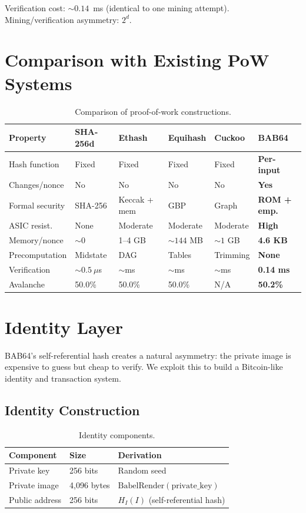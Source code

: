 \documentclass[preprint]{iacrtrans}
\begin{document}
Verification cost: ${\sim}0.14$~ms (identical to one mining attempt). Mining/verification asymmetry: $2^d$.

\section{Comparison with Existing PoW Systems}

\begin{table}[h]
\centering
\small
\begin{tabular}{@{}lp{1.5cm}p{1.5cm}p{1.5cm}p{1.3cm}p{1.5cm}@{}}
\toprule
\textbf{Property} & \textbf{SHA-256d} & \textbf{Ethash} & \textbf{Equihash} & \textbf{Cuckoo} & \textbf{BAB64} \\
\midrule
Hash function & Fixed & Fixed & Fixed & Fixed & \textbf{Per-input} \\
Changes/nonce & No & No & No & No & \textbf{Yes} \\
Formal security & SHA-256 & Keccak + mem & GBP & Graph & \textbf{ROM + emp.} \\
ASIC resist. & None & Moderate & Moderate & Moderate & \textbf{High} \\
Memory/nonce & ${\sim}0$ & 1--4 GB & ${\sim}144$ MB & ${\sim}1$ GB & \textbf{4.6 KB} \\
Precomputation & Midstate & DAG & Tables & Trimming & \textbf{None} \\
Verification & ${\sim}0.5~\mu$s & ${\sim}$ms & ${\sim}$ms & ${\sim}$ms & \textbf{0.14 ms} \\
Avalanche & 50.0\% & 50.0\% & 50.0\% & N/A & \textbf{50.2\%} \\
\bottomrule
\end{tabular}
\caption{Comparison of proof-of-work constructions.}
\end{table}

\section{Identity Layer}

BAB64's self-referential hash creates a natural asymmetry: the private image is expensive to guess but cheap to verify. We exploit this to build a Bitcoin-like identity and transaction system.

\subsection{Identity Construction}

\begin{table}[h]
\centering
\begin{tabular}{@{}lll@{}}
\toprule
\textbf{Component} & \textbf{Size} & \textbf{Derivation} \\
\midrule
Private key & 256 bits & Random seed \\
Private image & 4{,}096 bytes & $\text{BabelRender}(\text{private\_key})$ \\
Public address & 256 bits & $H_I(I)$ (self-referential hash) \\
\bottomrule
\end{tabular}
\caption{Identity components.}
\end{table}
\end{document}
